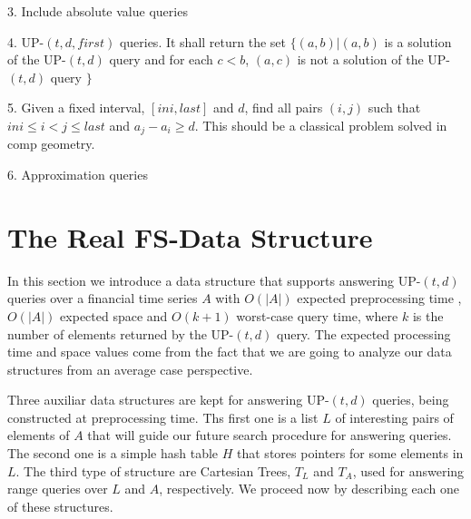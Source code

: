 \documentclass[12pt,letterpaper]{article}
\begin{document}
3. Include absolute value queries

4. UP-$(t,d,first)$ queries. It 
shall return the set 
$\{ (a,b) | (a,b)$ is a solution of the UP-$(t,d)$
query and for each $c<b$, $(a,c)$ is not a solution of the UP-$(t,d)$ query $\}$


5. Given a fixed interval, 
$[ini,last]$ and $d$,
find all pairs $(i,j)$ such
that $ini \leq i < j \leq last$ and
$a_j-a_i \geq d$. This should be a classical problem solved in 
comp geometry.

6. Approximation queries


\section{The Real FS-Data Structure}

%
%
%
%
%
%
%
In this section we introduce a data structure that supports answering UP-$(t,d)$ queries
over a financial time series $A$ with $O(|A|)$ expected preprocessing time , $O(|A|)$ expected space
and $O(k + 1)$ worst-case query time, where $k$ is the number of elements returned by the UP-$(t,d)$ query.
The expected processing time and space values come from the fact that we are going to analyze
our data structures from an average case perspective.

Three auxiliar data structures are kept for answering  UP-$(t,d)$ queries, being constructed at preprocessing time.
Ths first one is a list $L$ of interesting pairs of elements of $A$ that will guide our future search procedure for answering queries.
The second one is a simple hash table $H$ that stores pointers for some elements in $L$.
The third type of structure are Cartesian Trees, $T_{L}$  and $T_{A}$, used for answering range queries over $L$ and $A$,
respectively. We proceed now by describing each one of these structures.

\end{document}
